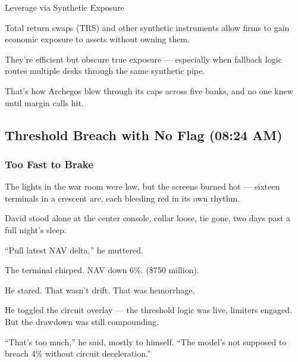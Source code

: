 \medskip

\medskip

\begin{HistoricalSidebar}{Leverage via Synthetic Exposure}

Total return swaps (TRS) and other synthetic instruments allow firms to gain economic exposure to assets 
without owning them.

\medskip

They’re efficient but obscure true exposure — especially when fallback logic routes multiple desks through the same 
synthetic pipe.

\medskip

That’s how Archegos blew through its caps across five banks, and no one knew until margin calls hit.

\end{HistoricalSidebar}

\subsection{Threshold Breach with No Flag (08:24 AM)} 

\subsubsection{Too Fast to Brake}

The lights in the war room were low, but the screens burned hot — sixteen terminals in a crescent arc, each bleeding red in its own rhythm.

David stood alone at the center console, collar loose, tie gone, two days past a full night’s sleep.

“Pull latest NAV delta,” he muttered.

The terminal chirped.
NAV down 6\%.
(\$750 million).

He stared. That wasn’t drift. That was hemorrhage.

He toggled the circuit overlay — the threshold logic was live, limiters engaged. But the drawdown was still compounding.

“That’s too much,” he said, mostly to himself. “The model’s not supposed to breach 4\% without circuit deceleration.”

\medskip

